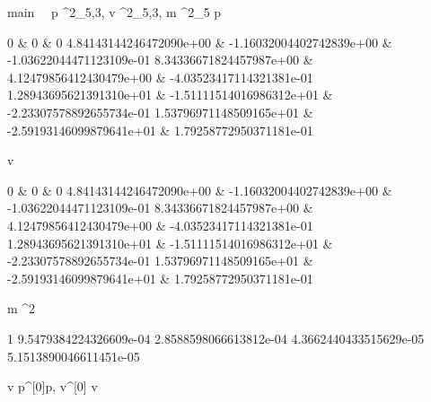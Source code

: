 \documentclass[12pt,a4paper]{book}
\begin{document}
\begin{eqcode}{main}{\ }{\ }{}
    p \in {}^2_{5,3},
    v \in {}^2_{5,3},
    m \in {}^2_{5} \lend
    p \gets \begin{tmatrix}
            0 & 0 & 0 \lend
            4.84143144246472090e+00 & -1.16032004402742839e+00 &
            -1.03622044471123109e-01 \lend
            8.34336671824457987e+00 & 4.12479856412430479e+00 &
            -4.03523417114321381e-01 \lend
            1.28943695621391310e+01 & -1.51111514016986312e+01 &
            -2.23307578892655734e-01 \lend
            1.53796971148509165e+01 & -2.59193146099879641e+01 &
            1.79258772950371181e-01 \lend 
        \end{tmatrix} \lend
    v  \cdot
        \begin{tmatrix}
            0 & 0 & 0 \lend
            4.84143144246472090e+00 & -1.16032004402742839e+00 &
            -1.03622044471123109e-01 \lend
            8.34336671824457987e+00 & 4.12479856412430479e+00 &
            -4.03523417114321381e-01 \lend
            1.28943695621391310e+01 & -1.51111514016986312e+01 &
            -2.23307578892655734e-01 \lend
            1.53796971148509165e+01 & -2.59193146099879641e+01 &
            1.79258772950371181e-01 \lend 
        \end{tmatrix} \lend
    m  \cdot \pi^2 \cdot 
        \begin{tmatrix}
            1 \lend
            9.5479384224326609e-04 \lend
            2.8588598066613812e-04 \lend
            4.3662440433515629e-05 \lend
            5.1513890046611451e-05 \lend
        \end{tmatrix} \lend
    v \gets {} \lend
    p^{[0]}\gets p, v^{[0]} \gets v \lend
     \lend
\end{eqcode}
\end{document}
